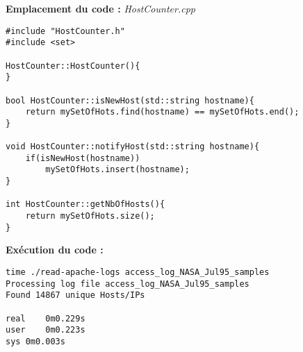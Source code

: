 \textbf{Emplacement du code : } \textit{HostCounter.cpp}
\begin{lstlisting}
#include "HostCounter.h"
#include <set>

HostCounter::HostCounter(){
}

bool HostCounter::isNewHost(std::string hostname){
    return mySetOfHots.find(hostname) == mySetOfHots.end();
}

void HostCounter::notifyHost(std::string hostname){
    if(isNewHost(hostname))
        mySetOfHots.insert(hostname);
}

int HostCounter::getNbOfHosts(){
    return mySetOfHots.size();
}
\end{lstlisting}

\textbf{Exécution du code : } \\
\begin{lstlisting}
time ./read-apache-logs access_log_NASA_Jul95_samples 
Processing log file access_log_NASA_Jul95_samples
Found 14867 unique Hosts/IPs

real	0m0.229s
user	0m0.223s
sys	0m0.003s
\end{lstlisting}

